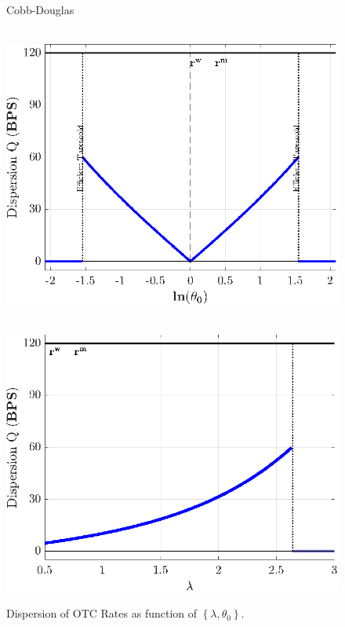 \documentclass[12pt,american,english,notitlepage]{article}
\begin{document}
\begin{figure}[htb]
\begin{centering}
\begin{minipage}[b]{.49\linewidth}
\end{minipage}

\vspace{10pt}
\end{centering}

\begin{centering}
\centerline{Cobb-Douglas }
   \begin{minipage}[b]{.49\linewidth} 
 \\[4pt]
\includegraphics[width=1\linewidth]{NewCode/Figures/F_cd_Q_theta.eps}
\end{minipage}
\begin{minipage}[b]{.49\linewidth}
 \\[4pt]
\includegraphics[width=1\linewidth]{NewCode/Figures/F_cd_Q_lambda.eps}
\end{minipage}
\end{centering}
\caption{\label{fig:dispersion}
 Dispersion of OTC Rates as function
of $\left\{ \lambda,\theta_{0}\right\} $.}  


\end{figure}
\end{document}
